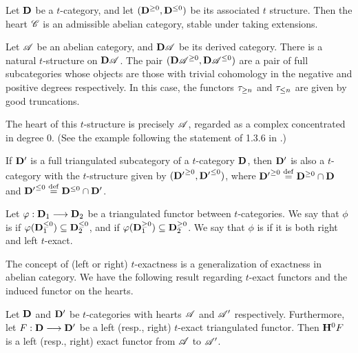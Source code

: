 \begin{thm}\label{thm_heart_is_abel_cat}
Let $\DCat$ be a $t$-category, and let $(\DCat^{\geq 0}, 
\DCat^{\leq 0})$ be its associated $t$ structure. Then the heart 
$\Cat{C}$ is an admissible abelian category, stable under
taking extensions. 
\end{thm}

\begin{ex}\label{ex_DA_t_struct}
Let $\Cat{A}$ be an abelian category, and $\DCat[D]\Cat{A}$ be its
derived category. There is a natural $t$-structure on 
$\DCat[D]\Cat{A}$. The pair $(\DCat[D]\Cat{A}^{\geq 0}, 
\DCat[D]\Cat{A}^{\leq 0})$ are a pair of full subcategories whose
objects are those with trivial cohomology in the negative and 
positive degrees respectively. In this case, the functors 
$\ggtrunc{n}$ and $\gltrunc{n}$ are given by good truncations. 

The heart of this $t$-structure is precisely $\Cat{A}$, regarded
as a complex concentrated in degree $0$. (See the example 
following the statement of 1.3.6 in \cite{BBD}.)
\end{ex}

\begin{ex}
If $\DCat'$ is a full triangulated subcategory of a $t$-category 
$\DCat$, then $\DCat'$ is also a $t$-category with the 
$t$-structure given by $({\DCat'}^{\geq 0}, {\DCat'}^{\leq 0})$, 
where ${\DCat'}^{\geq 0} \defeq \DCat^{\geq 0} \cap \DCat$ and 
${\DCat'}^{\leq 0} \defeq \DCat^{\leq 0} \cap \DCat'$. 
\end{ex}

\begin{defn}
Let $\phi: \DCat_1 \to \DCat_2$ be a triangulated functor between
$t$-categories. We say that $\phi$ is  if 
$\phi(\DCat_1^{\leq 0}) \subseteq \DCat_2^{\leq 0}$, and  
 if $\phi(\DCat_1^{\geq 0}) \subseteq 
\DCat_2^{\geq 0}$. We say that $\phi$ is  
if it is both right and left $t$-exact.
\end{defn}

The concept of (left or right) $t$-exactness is a generalization 
of exactness in abelian category. We have the following result
regarding $t$-exact functors and the induced functor on the
hearts.

\begin{prop}\label{prop_t_exact_implies_exact}
Let $\DCat$ and $\DCat'$ be $t$-categories with hearts 
$\Cat{A}$ and $\Cat{A}'$ respectively. Furthermore, let $F: 
\DCat \to \DCat'$ be a left (resp., right) $t$-exact triangulated 
functor. Then $\HH^0 F$ is a left (resp., right) exact 
functor from $\Cat{A}$ to $\Cat{A}'$.
\end{prop}

